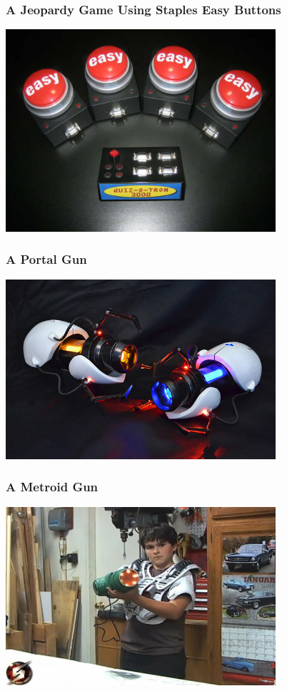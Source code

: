\documentclass[yellow]{beamer}
\begin{document}
\begin{frame}
\frametitle{A Jeopardy Game Using Staples Easy Buttons}
\begin{center}
	\includegraphics[width=0.75\textwidth]{jeopardy.jpg}
\end{center}
\end{frame}

\begin{frame}
\frametitle{A Portal Gun}
\begin{center}
	\includegraphics[width=0.75\textwidth]{portal.jpg}
\end{center}
\end{frame}

\begin{frame}
\frametitle{A Metroid Gun}
\begin{center}
	\includegraphics[width=0.75\textwidth]{samus.jpg}
\end{center}
\end{frame}
\end{document}
